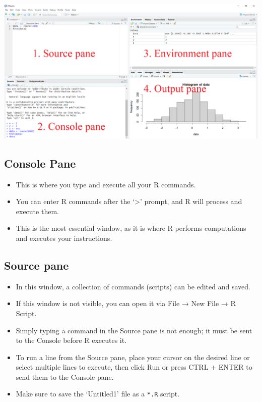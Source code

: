 \documentclass[
  letterpaper,
  DIV=11,
  numbers=noendperiod]{scrreprt}
\begin{document}
\begin{center}
\includegraphics[width=1\textwidth,height=\textheight]{fig/1_Rstudio_Layout.png}
\end{center}

\subsection{Console Pane}\label{console-pane}

\begin{itemize}
\item
  This is where you type and execute all your R commands.
\item
  You can enter R commands after the `\textgreater{}' prompt, and R will
  process and execute them.
\item
  This is the most essential window, as it is where R performs
  computations and executes your instructions.
\end{itemize}

\subsection{Source pane}\label{source-pane}

\begin{itemize}
\item
  In this window, a collection of commands (scripts) can be edited and
  saved.
\item
  If this window is not visible, you can open it via File → New File → R
  Script.
\item
  Simply typing a command in the Source pane is not enough; it must be
  sent to the Console before R executes it.
\item
  To run a line from the Source pane, place your cursor on the desired
  line or select multiple lines to execute, then click Run or press CTRL
  + ENTER to send them to the Console pane.
\item
  Make sure to save the `Untitled1' file as a \texttt{*.R} script.
\end{itemize}
\end{document}

